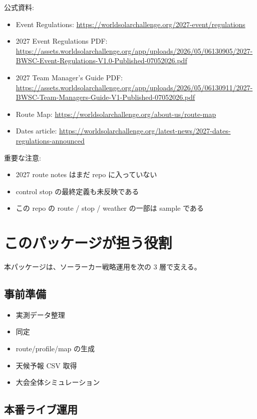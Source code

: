 \documentclass[a4paper,11pt]{article}
\begin{document}
公式資料:

\begin{itemize}
  \item Event Regulations: \url{https://worldsolarchallenge.org/2027-event/regulations}
  \item 2027 Event Regulations PDF: \url{https://assets.worldsolarchallenge.org/app/uploads/2026/05/06130905/2027-BWSC-Event-Regulations-V1.0-Published-07052026.pdf}
  \item 2027 Team Manager's Guide PDF: \url{https://assets.worldsolarchallenge.org/app/uploads/2026/05/06130911/2027-BWSC-Team-Managers-Guide-V1-Published-07052026.pdf}
  \item Route Map: \url{https://worldsolarchallenge.org/about-us/route-map}
  \item Dates article: \url{https://worldsolarchallenge.org/latest-news/2027-dates-regulations-announced}
\end{itemize}

重要な注意:

\begin{itemize}
  \item 2027 route notes はまだ repo に入っていない
  \item control stop の最終定義も未反映である
  \item この repo の route / stop / weather の一部は sample である
\end{itemize}

\section{このパッケージが担う役割}

本パッケージは、ソーラーカー戦略運用を次の 3 層で支える。

\subsection{事前準備}

\begin{itemize}
  \item 実測データ整理
  \item 同定
  \item route/profile/map の生成
  \item 天候予報 CSV 取得
  \item 大会全体シミュレーション
\end{itemize}

\subsection{本番ライブ運用}
\end{document}

